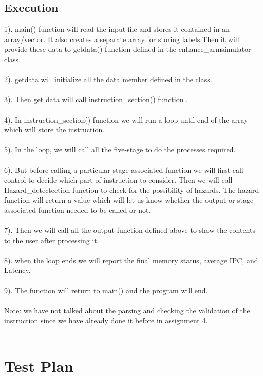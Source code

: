\documentclass{scrreprt}
\begin{document}
\section{Execution}
$ $ 
\\
1). main() function will read the input file and stores it contained in an array/vector. It also creates a separate array for storing labels.Then it will provide these data to getdata() function defined in the enhance_armsimulator class. \\
\\
2). getdata will initialize all the data member defined in the class.
\\
\\
3). Then get data will call instruction_section() function .
\\
\\
4). In instruction_section() function we will run a loop until end of the array which will store the instruction.
\\
\\
5). In the loop, we will call all the five-stage to do the processes required.
\\
\\
6). But before calling a particular stage associated function we will first call control to decide which part of instruction to consider. Then we will call Hazard_detectection function to check for the possibility of hazards. The hazard function will return a value which will let us know whether the output or stage associated function needed to be called or not.
\\
\\
7). Then we will call all the output function defined above to show the contents to the user after processing it.
\\
\\8). when the loop ends we will report the final memory status, average IPC, and Latency.
\\
\\
9). The function will return to main() and the program will end.
\\
\\
Note: we have not talked about the parsing and checking the validation of the instruction since we have already done it before in assignment 4. 
\\
\\
$ $
\chapter{Test Plan}
$ $
\\
\\
$ $
\end{document}
